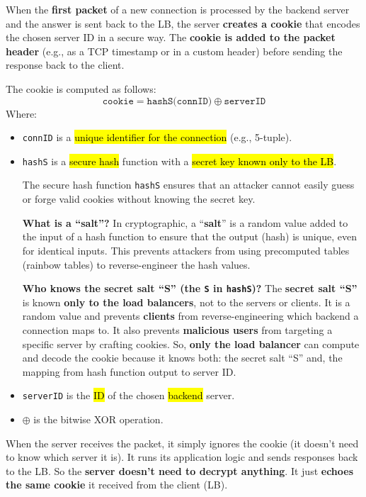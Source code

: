 \begin{enumerate}
    When the \textbf{first packet} of a new connection is processed by the backend server and the answer is sent back to the LB, the server \textbf{creates a cookie} that encodes the chosen server ID in a secure way. The \textbf{cookie is added to the packet header} (e.g., as a TCP timestamp or in a custom header) before sending the response back to the client.
    
    The cookie is computed as follows:
    \begin{equation*}
        \texttt{cookie} = \texttt{hashS(connID)} \oplus \texttt{serverID}
    \end{equation*}
    Where:
    \begin{itemize}
        \item \texttt{connID} is a \hl{unique identifier for the connection} (e.g., 5-tuple).
        \item \texttt{hashS} is a \hl{secure hash} function with a \hl{secret key known only to the LB}.
        \begin{deepeningbox}
            The secure hash function \texttt{hashS} ensures that an attacker cannot easily guess or forge valid cookies without knowing the secret key.

            \textcolor{Green3}{ \textbf{What is a ``salt''?}} In cryptographic, a ``\textbf{salt}'' is a random value added to the input of a hash function to ensure that the output (hash) is unique, even for identical inputs. This prevents attackers from using precomputed tables (rainbow tables) to reverse-engineer the hash values.

            \textcolor{Green3}{ \textbf{Who knows the secret salt ``S'' (the \texttt{S} in \texttt{hashS})?}} The \textbf{secret salt ``S''} is known \textbf{only to the load balancers}, not to the servers or clients. It is a random value and prevents \textbf{clients} from reverse-engineering which backend a connection maps to. It also prevents \textbf{malicious users} from targeting a specific server by crafting cookies. So, \textbf{only the load balancer} can compute and decode the cookie because it knows both: the secret salt ``S'' and, the mapping from hash function output to server ID.
        \end{deepeningbox}
        \item \texttt{serverID} is the \hl{ID} of the chosen \hl{backend} server.
        \item $\oplus$ is the bitwise XOR operation.
    \end{itemize}
    When the server receives the packet, it simply ignores the cookie (it doesn't need to know which server it is). It runs its application logic and sends responses back to the LB. So the \textbf{server doesn't need to decrypt anything}. It just \textbf{echoes the same cookie} it received from the client (LB).



\end{enumerate}
